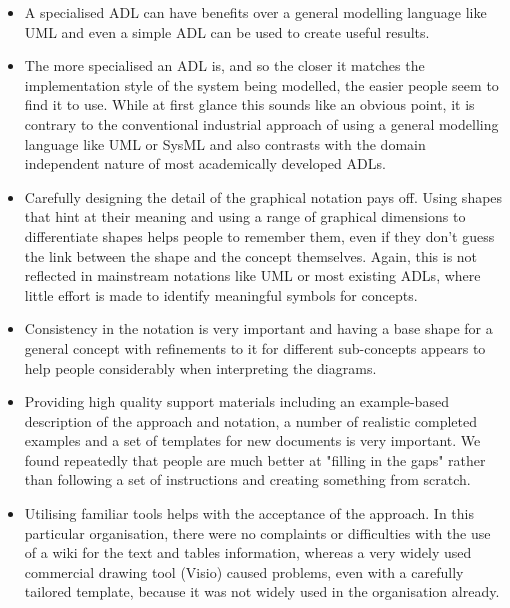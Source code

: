 \begin{itemize}

\item A specialised ADL can have benefits over a general modelling language like UML and even a simple ADL can be used to create useful results.

\item The more specialised an ADL is, and so the closer it matches the implementation style of the system being modelled, the easier people seem to find it to use.  While at first glance this sounds like an obvious point, it is contrary to the conventional industrial approach of using a general modelling language like UML or SysML and also contrasts with the domain independent nature of most academically developed ADLs.

\item Carefully designing the detail of the graphical notation pays off.  Using shapes that hint at their meaning and using a range of graphical dimensions to differentiate shapes helps people to remember them, even if they don't guess the link between the shape and the concept themselves.  Again, this is not reflected in mainstream notations like UML or most existing ADLs, where little effort is made to identify meaningful symbols for concepts.

\item Consistency in the notation is very important and having a base shape for a general concept with refinements to it for different sub-concepts appears to help people considerably when interpreting the diagrams.

\item Providing high quality support materials including an example-based description of the approach and notation, a number of realistic completed examples and a set of templates for new documents is very important.  We found repeatedly that people are much better at "filling in the gaps" rather than following a set of instructions and creating something from scratch.

\item Utilising familiar tools helps with the acceptance of the approach.  In this particular organisation, there were no complaints or difficulties with the use of a wiki for the text and tables information, whereas a very widely used commercial drawing tool (Visio) caused problems, even with a carefully tailored template, because it was not widely used in the organisation already.

\end{itemize}

